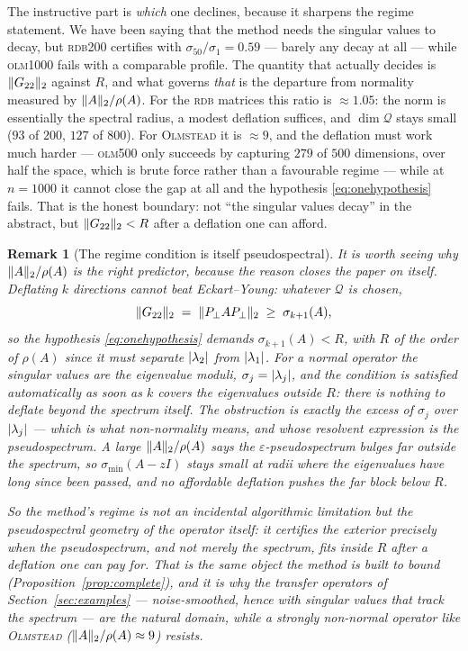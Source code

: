 \documentclass[11pt]{article}
\newtheorem{remark}[theorem]{Remark}
\newcommand{\sigmin}{\sigma_{\min}}
\DeclarePairedDelimiter{\norm}{\lVert}{\rVert}
\DeclarePairedDelimiter{\abs}{\lvert}{\rvert}
\begin{document}
The instructive part is \emph{which} one declines, because it sharpens the regime statement. We have
been saying that the method needs the singular values to decay, but \textsc{rdb200} certifies with
$\sigma_{50}/\sigma_1=0.59$ --- barely any decay at all --- while \textsc{olm1000} fails with a
comparable profile. The quantity that actually decides is $\norm{G_{22}}_2$ against $R$, and what
governs \emph{that} is the departure from normality measured by $\norm{A}_2/\rho(A)$. For the
\textsc{rdb} matrices this ratio is $\approx1.05$: the norm is essentially the spectral radius, a
modest deflation suffices, and $\dim\mathcal Q$ stays small ($93$ of $200$, $127$ of $800$). For
\textsc{Olmstead} it is $\approx9$, and the deflation must work much harder --- \textsc{olm500} only
succeeds by capturing $279$ of $500$ dimensions, over half the space, which is brute force rather
than a favourable regime --- while at $n=1000$ it cannot close the gap at all and the hypothesis
\eqref{eq:onehypothesis} fails. That is the honest boundary: not ``the singular values decay'' in the
abstract, but $\norm{G_{22}}_2<R$ after a deflation one can afford.

\begin{remark}[The regime condition is itself pseudospectral]\label{rem:pseudoobstruction}
It is worth seeing why $\norm{A}_2/\rho(A)$ is the right predictor, because the reason closes the
paper on itself. Deflating $k$ directions cannot beat Eckart--Young: whatever $\mathcal Q$ is chosen,
\[
  \norm{G_{22}}_2\;=\;\norm{P_\perp AP_\perp}_2\;\ge\;\sigma_{k+1}(A),
\]
so the hypothesis \eqref{eq:onehypothesis} demands $\sigma_{k+1}(A)<R$, with $R$ of the order of
$\rho(A)$ since it must separate $\abs{\lambda_2}$ from $\abs{\lambda_1}$. For a \emph{normal}
operator the singular values are the eigenvalue moduli, $\sigma_j=\abs{\lambda_j}$, and the condition
is satisfied automatically as soon as $k$ covers the eigenvalues outside $R$: there is nothing to
deflate beyond the spectrum itself. The obstruction is exactly the \emph{excess} of $\sigma_j$ over
$\abs{\lambda_j}$ --- which is what non-normality means, and whose resolvent expression is the
pseudospectrum. A large $\norm{A}_2/\rho(A)$ says the $\varepsilon$-pseudospectrum bulges far outside
the spectrum, so $\sigmin(A-zI)$ stays small at radii where the eigenvalues have long since been
passed, and no affordable deflation pushes the far block below $R$.

So the method's regime is not an incidental algorithmic limitation but the pseudospectral geometry of
the operator itself: it certifies the exterior precisely when the \emph{pseudospectrum}, and not
merely the spectrum, fits inside $R$ after a deflation one can pay for. That is the same object the
method is built to bound (Proposition~\ref{prop:complete}), and it is why the transfer operators of
Section~\ref{sec:examples} --- noise-smoothed, hence with singular values that track the spectrum ---
are the natural domain, while a strongly non-normal operator like \textsc{Olmstead}
($\norm{A}_2/\rho(A)\approx9$) resists.
\end{remark}
\end{document}
